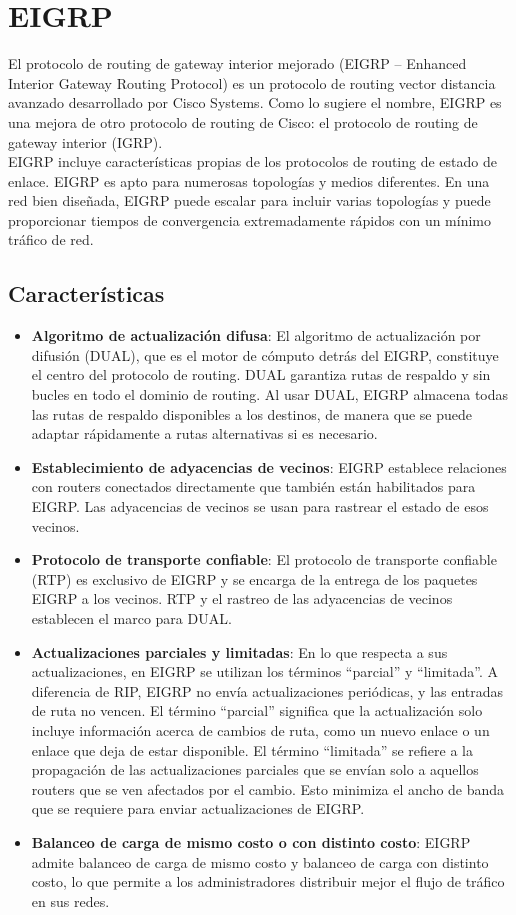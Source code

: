 \documentclass[
	12pt, %
	fleqn, %
	a4paper, %
	oneside, %
]{LegrandOrangeBook}
\begin{document}
\section{EIGRP}
El protocolo de routing de gateway interior mejorado (EIGRP – Enhanced Interior Gateway Routing Protocol) es un protocolo de routing vector distancia avanzado desarrollado por Cisco Systems. Como lo sugiere el nombre, EIGRP es una mejora de otro protocolo de routing de Cisco: el protocolo de routing de gateway interior (IGRP).\\
EIGRP incluye características propias de los protocolos de routing de estado de enlace. EIGRP es apto para numerosas topologías y medios diferentes. En una red bien diseñada, EIGRP puede escalar para incluir varias topologías y puede proporcionar tiempos de convergencia extremadamente rápidos con un mínimo tráfico de red.
\subsection{Características}
\begin{itemize}
\item \textbf{Algoritmo de actualización difusa}: El algoritmo de actualización por difusión (DUAL), que es el motor de cómputo detrás del EIGRP, constituye el centro del protocolo de routing. DUAL garantiza rutas de respaldo y sin bucles en todo el dominio de routing. Al usar DUAL, EIGRP almacena todas las rutas de respaldo disponibles a los destinos, de manera que se puede adaptar rápidamente a rutas alternativas si es necesario.
\item \textbf{Establecimiento de adyacencias de vecinos}: EIGRP establece relaciones con routers conectados directamente que también están habilitados para EIGRP. Las adyacencias de vecinos se usan para rastrear el estado de esos vecinos.
\item \textbf{Protocolo de transporte confiable}: El protocolo de transporte confiable (RTP) es exclusivo de EIGRP y se encarga de la entrega de los paquetes EIGRP a los vecinos. RTP y el rastreo de las adyacencias de vecinos establecen el marco para DUAL.
\item \textbf{Actualizaciones parciales y limitadas}: En lo que respecta a sus actualizaciones, en EIGRP se utilizan los términos “parcial” y “limitada”. A diferencia de RIP, EIGRP no envía actualizaciones periódicas, y las entradas de ruta no vencen. El término “parcial” significa que la actualización solo incluye información acerca de cambios de ruta, como un nuevo enlace o un enlace que deja de estar disponible. El término “limitada” se refiere a la propagación de las actualizaciones parciales que se envían solo a aquellos routers que se ven afectados por el cambio. Esto minimiza el ancho de banda que se requiere para enviar actualizaciones de EIGRP.
\item \textbf{Balanceo de carga de mismo costo o con distinto costo}: EIGRP admite balanceo de carga de mismo costo y balanceo de carga con distinto costo, lo que permite a los administradores distribuir mejor el flujo de tráfico en sus redes.
\end{itemize}
\end{document}
